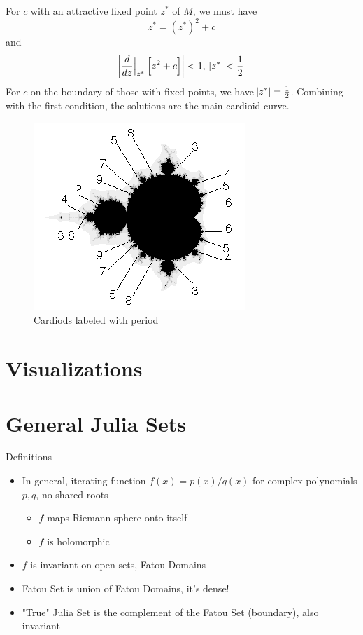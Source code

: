 \documentclass{article}
\begin{document}
For $c$ with an attractive fixed point $z^*$ of $M$, we must have
\[ z^* = (z^*)^2 + c \]
and
\[ \abs{\frac{d}{dz}\Bigr|_{z^*}\left[z^2 + c\right]} < 1,\ \abs{z^*} < \frac{1}{2} \]
For $c$ on the boundary of those with fixed points, we have $\abs{z^*} = \frac{1}{2}$. Combining with the first condition, the solutions are the main cardioid curve.



\begin{figure}[!htbp]
    \centering
    \includegraphics[width=.4\linewidth]{images/MandelMap1.png}
    \caption{Cardiods labeled with period \cite{MichaelFrame}} %
    \label{fig:MandelbrotCycles}
\end{figure}


\section{Visualizations}



\section{General Julia Sets}

Definitions
\begin{itemize}
    \item In general, iterating function $f(x) = p(x) / q(x)$ for complex polynomials $p, q$, no shared roots
    \begin{itemize}
        \item $f$ maps Riemann sphere onto itself
        \item $f$ is holomorphic
    \end{itemize}
    \item $f$ is invariant on open sets, Fatou Domains
    \item Fatou Set is union of Fatou Domains, it's dense!
    \item "True" Julia Set is the complement of the Fatou Set (boundary), also invariant
\end{itemize}
\end{document}

